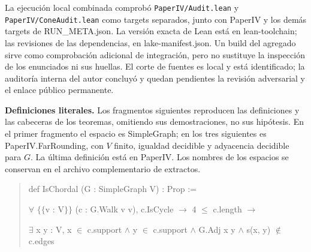 \documentclass[spanish,11pt,a4paper]{article}
\begin{document}
La ejecución local combinada comprobó \nolinkurl{PaperIV/Audit.lean} y \nolinkurl{PaperIV/ConeAudit.lean} como targets separados, junto con {\ttfamily\small PaperIV} y los demás targets de {\ttfamily\small RUN\_\discretionary{\hbox{\ensuremath{\hookrightarrow}}}{}{}META.\discretionary{\hbox{\ensuremath{\hookrightarrow}}}{}{}json}. La versión exacta de Lean está en {\ttfamily\small lean-\discretionary{\hbox{\ensuremath{\hookrightarrow}}}{}{}toolchain}; las revisiones de las dependencias, en {\ttfamily\small lake-\discretionary{\hbox{\ensuremath{\hookrightarrow}}}{}{}manifest.\discretionary{\hbox{\ensuremath{\hookrightarrow}}}{}{}json}. Un build del agregado sirve como comprobación adicional de integración, pero no sustituye la inspección de los enunciados ni sus huellas. El corte de fuentes es local y está identificado; la auditoría interna del autor concluyó y quedan pendientes la revisión adversarial y el enlace público permanente.

\textbf{Definiciones literales.} Los fragmentos siguientes reproducen las definiciones y las cabeceras de los teoremas, omitiendo sus demostraciones, no sus hipótesis. En el primer fragmento el espacio es {\ttfamily\small SimpleGraph}; en los tres siguientes es {\ttfamily\small PaperIV.\discretionary{\hbox{\ensuremath{\hookrightarrow}}}{}{}FarRounding}, con \(V\) finito, igualdad decidible y adyacencia decidible para \(G\). La última definición está en {\ttfamily\small PaperIV}. Los nombres de los espacios se conservan en el archivo complementario de extractos.

\begin{quote}\footnotesize\ttfamily\raggedright
def IsChordal (G : SimpleGraph V) : Prop :=\par
  \(\forall\) \(\{\!\{\)v : V\(\}\!\}\) (c : G.Walk v v), c.IsCycle \(\to\) 4 \(\le\) c.length \(\to\)\par
    \(\exists\) x y : V, x \(\in\) c.support \(\land\) y \(\in\) c.support \(\land\) G.Adj x y \(\land\) s(x, y) \(\notin\) c.edges\par
\end{quote}
\end{document}
